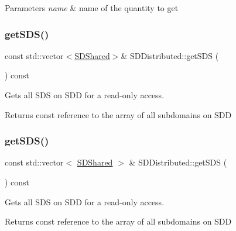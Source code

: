 \begin{DoxyParams}{Parameters}
{\em name} & name of the quantity to get \\
\hline
\end{DoxyParams}
\mbox{\label{classSDDistributed_a2bbdfc4e93476c4ee8cc0b55682a7a5b}} 
\subsubsection{\texorpdfstring{get\+S\+D\+S()}{getSDS()}\hspace{0.1cm}{\footnotesize\ttfamily [1/2]}}
{\footnotesize\ttfamily const std\+::vector$<$\hyperlink{classSDShared}{S\+D\+Shared}$>$\& S\+D\+Distributed\+::get\+S\+DS (\begin{DoxyParamCaption}{ }\end{DoxyParamCaption}) const}



Gets all S\+DS on S\+DD for a read-\/only access. 

\begin{DoxyReturn}{Returns}
const reference to the array of all subdomains on S\+DD 
\end{DoxyReturn}
\mbox{\label{classSDDistributed_a9afba0607b6012a0e446b95251559f5d}} 
\subsubsection{\texorpdfstring{get\+S\+D\+S()}{getSDS()}\hspace{0.1cm}{\footnotesize\ttfamily [2/2]}}
{\footnotesize\ttfamily const std\+::vector$<$ \hyperlink{classSDShared}{S\+D\+Shared} $>$ \& S\+D\+Distributed\+::get\+S\+DS (\begin{DoxyParamCaption}{ }\end{DoxyParamCaption}) const}



Gets all S\+DS on S\+DD for a read-\/only access. 

\begin{DoxyReturn}{Returns}
const reference to the array of all subdomains on S\+DD 
\end{DoxyReturn}
\mbox{\label{classSDDistributed_a567b9535558271515166ce7ebd3f6c29}} 
